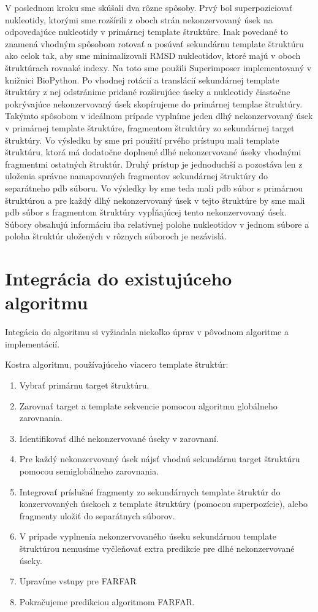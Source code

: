 \indent V poslednom kroku sme skúšali dva rôzne spôsoby. 
Prvý bol superpoziciovať nukleotidy, ktorými sme rozšírili z oboch strán nekonzervovaný úsek na odpovedajúce nukleotidy v primárnej template štruktúre. Inak povedané to znamená vhodným spôsobom rotovať a posúvať sekundárnu template štruktúru ako celok tak, aby sme minimalizovali RMSD nukleotidov, ktoré majú v oboch štruktúrach rovnaké indexy. Na toto sme použili Superimposer implementovaný v knižnici BioPython. Po vhodnej rotácií a translácií sekundárnej template štruktúry z nej odstránime pridané rozširujúce úseky a nukleotidy čiastočne pokrývajúce nekonzervovaný úsek skopírujeme do primárnej templae štruktúry. Takýmto spôsobom v ideálnom prípade vyplníme jeden dlhý nekonzervovaný úsek v primárnej template štruktúre, fragmentom štruktúry zo sekundárnej target štruktúry. Vo výsledku by sme pri použití prvého prístupu mali template štruktúru, ktorá má dodatočne doplnené dlhé nekonzervované úseky vhodnými fragmentmi ostatných štruktúr.
Druhý prístup je jednoduchší a pozostáva len z uloženia správne namapovaných fragmentov sekundárnej štruktúry do separátneho pdb súboru. Vo výsledky by sme  teda mali pdb súbor s primárnou štruktúrou a pre každý dlhý nekonzervovaný úsek v tejto štruktúre by sme mali pdb súbor s fragmentom štruktúry vypĺňajúcej tento nekonzervovaný úsek. Súbory obsahujú informáciu iba  relatívnej polohe nukleotidov v jednom súbore a poloha štruktúr uložených v rôznych súboroch je nezávislá.

\section{Integrácia do existujúceho algoritmu}
Integácia do algoritmu si vyžiadala niekoľko úprav v pôvodnom algoritme a implementácií.

\indent Kostra algoritmu, používajúceho viacero template štruktúr:
\begin{enumerate}
\item Vybrať primárnu target štruktúru.
\item Zarovnať  target a template sekvencie pomocou algoritmu globálneho zarovnania.
\item Identifikovať dlhé nekonzervované úseky v zarovnaní.
\item Pre každý nekonzervovaný úsek nájsť vhodnú sekundárnu target štruktúru pomocou semiglobálneho zarovnania.
\item Integrovať príslušné fragmenty zo sekundárnych template štruktúr do konzervovaných úsekoch z template štruktúry (pomocou superpozície), alebo fragmenty uložiť do separátnych súborov.
\item V prípade vyplnenia nekonzervovaného úseku sekundárnou template štruktúrou nemusíme vyčleňovať extra predikcie pre dlhé nekonzervované úseky.
\item Upravíme vstupy pre FARFAR
\item Pokračujeme predikciou algoritmom FARFAR.
\end{enumerate}


